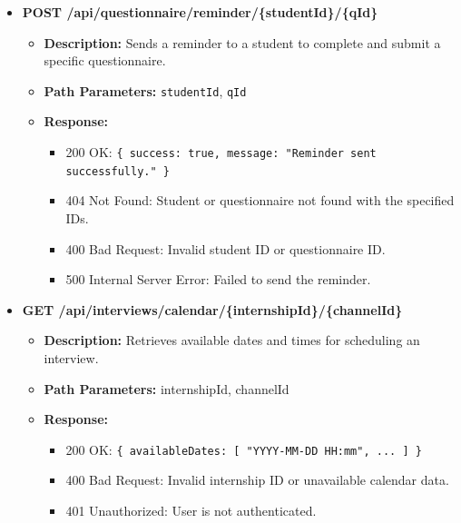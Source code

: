 \begin{itemize}
    \item \textbf{POST /api/questionnaire/reminder/\{studentId\}/\{qId\}}  
    \begin{itemize}
        \item \textbf{Description:} Sends a reminder to a student to complete and submit a specific questionnaire.
        \item \textbf{Path Parameters:} \texttt{studentId}, \texttt{qId}
        \item \textbf{Response:}
        \begin{itemize}
            \item 200 OK: \texttt{\{ success: true, message: "Reminder sent successfully." \}}
            \item 404 Not Found: Student or questionnaire not found with the specified IDs.
            \item 400 Bad Request: Invalid student ID or questionnaire ID.
            \item 500 Internal Server Error: Failed to send the reminder.
        \end{itemize}
    \end{itemize}


    \item \textbf{GET /api/interviews/calendar/\{internshipId\}/\{channelId\}}  
    \begin{itemize}
        \item \textbf{Description:} Retrieves available dates and times for scheduling an interview.
        \item \textbf{Path Parameters:} internshipId, channelId
        \item \textbf{Response:}
        \begin{itemize}
            \item 200 OK: \texttt{\{ availableDates: [ "YYYY-MM-DD HH:mm", ... ] \}}
            \item 400 Bad Request: Invalid internship ID or unavailable calendar data.
            \item 401 Unauthorized: User is not authenticated.
        \end{itemize}
    \end{itemize}


\end{itemize}
